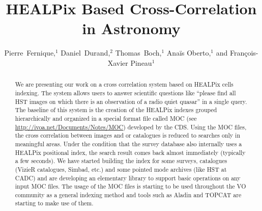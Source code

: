 
\resetcounters




\title{HEALPix Based Cross-Correlation in Astronomy}
\author{Pierre~Fernique,$^1$ Daniel~Durand,$^2$ Thomas~Boch,$^1$ Ana\"is Oberto,$^1$ and Fran\c{c}ois-Xavier Pineau$^1$
}


\begin{abstract}
We are presenting our work on a cross correlation system based on
        HEALPix cells indexing. The system allows users to answer
        scientific
        questions like ``please find all HST images on which there is an
        observation of a radio quiet quasar'' in a single query. The baseline
        of this system is the creation of the HEALPix indexes grouped
        hierarchically and organized in a special format file called MOC
        (see \url{http://ivoa.net/Documents/Notes/MOC}) developed by the CDS. Using the MOC files,
         the cross correlation between images and or catalogues is reduced to searches only in meaningful areas. Under the condition that the
        survey database also internally uses a HEALPix positional index,
        the search result comes back almost immediately (typically a few
        seconds).
        We have started building the index for some surveys, catalogues (VizieR
        catalogues, Simbad, etc.) and some pointed mode archives (like HST at
        CADC) and are developing an elementary library to support basic operations
        on any input MOC files. The usage of the MOC files is starting to
        be used throughout the VO community as a general indexing method and
        tools such as Aladin and TOPCAT are starting to
        make use of them.
\end{abstract}

